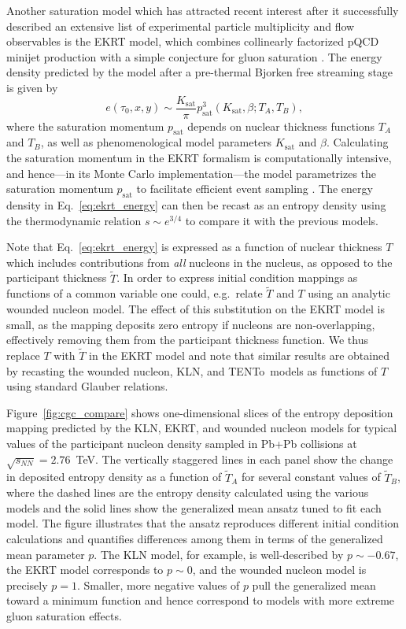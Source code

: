 \documentclass[aps,prc,reprint,amsmath,nofootinbib]{revtex4-1}
\newcommand{\trento}{T\raisebox{-0.5ex}{R}ENTo}
\newcommand{\sqrts}{\sqrt{s_{NN}}}
\newcommand{\T}{\tilde{T}}
\begin{document}
Another saturation model which has attracted recent interest after it successfully described an extensive list of experimental particle multiplicity and flow observables \cite{Niemi:2015qia, Paatelainen:2013eea} is the EKRT model, which combines collinearly factorized pQCD minijet production with a simple conjecture for gluon saturation \cite{Eskola:1999fc, Eskola:2001bf}.
The energy density predicted by the model after a pre-thermal Bjorken free streaming stage is given by
\begin{equation}
  e(\tau_0, x, y) \sim \frac{K_\text{sat}}{\pi} p_\text{sat}^3(K_\text{sat}, \beta; T_A, T_B),
  \label{eq:ekrt_energy}
\end{equation}
where the saturation momentum $p_\text{sat}$ depends on nuclear thickness functions $T_A$ and $T_B$, as well as phenomenological model parameters $K_\text{sat}$ and $\beta$.
Calculating the saturation momentum in the EKRT formalism is computationally intensive, and hence---in its Monte Carlo implementation---the model parametrizes the saturation momentum $p_\text{sat}$ to facilitate efficient event sampling \cite{Niemi:2015qia}.
The energy density in Eq.~\eqref{eq:ekrt_energy} can then be recast as an entropy density using the thermodynamic relation ${s \sim e^{3/4}}$ to compare it with the previous models.

Note that Eq.~\eqref{eq:ekrt_energy} is expressed as a function of nuclear thickness $T$ which includes contributions from \emph{all} nucleons in the nucleus, as opposed to the participant thickness $\T$.
In order to express initial condition mappings as functions of a common variable one could, e.g.\ relate $\T$ and $T$ using an analytic wounded nucleon model.
The effect of this substitution on the EKRT model is small, as the mapping deposits zero entropy if nucleons are non-overlapping, effectively removing them from the participant thickness function.
We thus replace $T$ with $\T$ in the EKRT model and note that similar results are obtained by recasting the wounded nucleon, KLN, and \trento\ models as functions of $T$ using standard Glauber relations.

Figure~\ref{fig:cgc_compare} shows one-dimensional slices of the entropy deposition mapping predicted by the KLN, EKRT, and wounded nucleon models for typical values of the participant nucleon density sampled in Pb+Pb collisions at $\sqrts=2.76$~TeV.
The vertically staggered lines in each panel show the change in deposited entropy density as a function of $\T_A$ for several constant values of $\T_B$, where the dashed lines are the entropy density calculated using the various models and the solid lines show the generalized mean ansatz tuned to fit each model.
The figure illustrates that the ansatz reproduces different initial condition calculations and quantifies differences among them in terms of the generalized mean parameter $p$.
The KLN model, for example, is well-described by $p\sim-0.67$, the EKRT model corresponds to $p \sim 0$, and the wounded nucleon model is precisely $p=1$.
Smaller, more negative values of $p$ pull the generalized mean toward a minimum function and hence correspond to models with more extreme gluon saturation effects.
\end{document}
